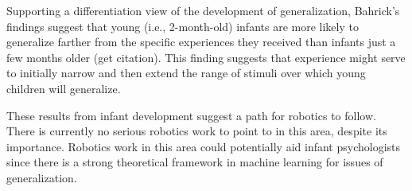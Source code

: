 \ifverbose
Supporting a differentiation view of the development of
generalization, Bahrick's findings suggest that young (i.e.,
2-month-old) infants are more likely to generalize farther from the
specific experiences they received than infants just a few months
older (get citation).  This finding suggests that experience might
serve to initially narrow and then extend the range of stimuli over
which young children will generalize.
\fi

These results from infant development suggest a path for
robotics to follow.  There is currently no serious robotics
work to point to in this area, despite its importance.
Robotics work in this area could potentially aid infant
psychologists since there is a strong theoretical framework
in machine learning for issues of generalization.



